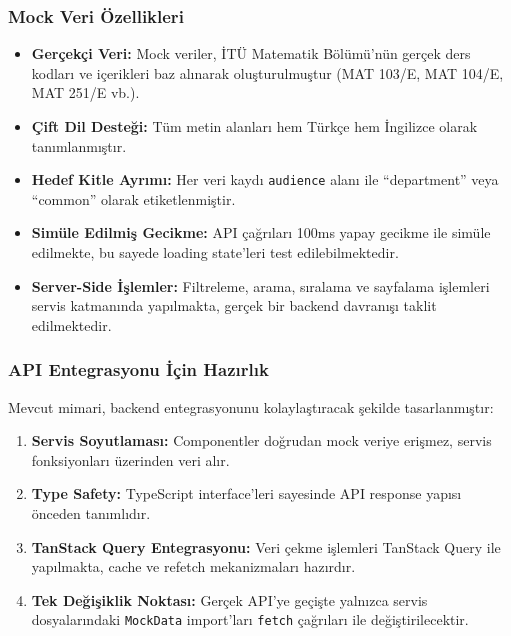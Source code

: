 \documentclass[12pt,a4paper]{article}
\begin{document}
\subsubsection{Mock Veri Özellikleri}

\begin{itemize}
    \item \textbf{Gerçekçi Veri:} Mock veriler, İTÜ Matematik Bölümü'nün gerçek ders kodları ve içerikleri baz alınarak oluşturulmuştur (MAT 103/E, MAT 104/E, MAT 251/E vb.).
    
    \item \textbf{Çift Dil Desteği:} Tüm metin alanları hem Türkçe hem İngilizce olarak tanımlanmıştır.
    
    \item \textbf{Hedef Kitle Ayrımı:} Her veri kaydı \texttt{audience} alanı ile ``department'' veya ``common'' olarak etiketlenmiştir.
    
    \item \textbf{Simüle Edilmiş Gecikme:} API çağrıları 100ms yapay gecikme ile simüle edilmekte, bu sayede loading state'leri test edilebilmektedir.
    
    \item \textbf{Server-Side İşlemler:} Filtreleme, arama, sıralama ve sayfalama işlemleri servis katmanında yapılmakta, gerçek bir backend davranışı taklit edilmektedir.
\end{itemize}

\subsubsection{API Entegrasyonu İçin Hazırlık}

Mevcut mimari, backend entegrasyonunu kolaylaştıracak şekilde tasarlanmıştır:

\begin{enumerate}
    \item \textbf{Servis Soyutlaması:} Componentler doğrudan mock veriye erişmez, servis fonksiyonları üzerinden veri alır.
    
    \item \textbf{Type Safety:} TypeScript interface'leri sayesinde API response yapısı önceden tanımlıdır.
    
    \item \textbf{TanStack Query Entegrasyonu:} Veri çekme işlemleri TanStack Query ile yapılmakta, cache ve refetch mekanizmaları hazırdır.
    
    \item \textbf{Tek Değişiklik Noktası:} Gerçek API'ye geçişte yalnızca servis dosyalarındaki \texttt{MockData} import'ları \texttt{fetch} çağrıları ile değiştirilecektir.
\end{enumerate}
\end{document}
